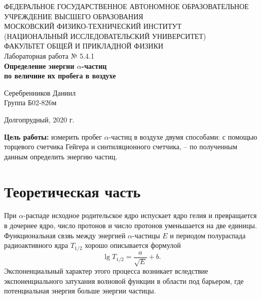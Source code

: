 \documentclass[a4paper,12pt]{article} %
\begin{document}
\begin{center}
	\footnotesize{ФЕДЕРАЛЬНОЕ ГОСУДАРСТВЕННОЕ АВТОНОМНОЕ ОБРАЗОВАТЕЛЬНОЕ 			УЧРЕЖДЕНИЕ ВЫСШЕГО ОБРАЗОВАНИЯ}\\
	\footnotesize{МОСКОВСКИЙ ФИЗИКО-ТЕХНИЧЕСКИЙ ИНСТИТУТ\\(НАЦИОНАЛЬНЫЙ 			ИССЛЕДОВАТЕЛЬСКИЙ УНИВЕРСИТЕТ)}\\
	\footnotesize{ФАКУЛЬТЕТ ОБЩЕЙ И ПРИКЛАДНОЙ ФИЗИКИ\\}
	\hfill \break
	\hfill\break
	\hfill\break
	\hfill \break
	\hfill \break
	\hfill \break
	\hfill \break
	\hfill \break
	\hfill \break
	\hfill \break
	\hfill \break
	\hfill \break
	\hfill \break
	\hfill \break
	\large{Лабораторная работа № 5.4.1 \\\textbf{Определение энергии $\alpha$-частиц\\по величине их пробега в воздухе}}\\
	\hfill \break
	\hfill \break
	\hfill \break
	\begin{flushright}
		Серебренников Даниил\\
		Группа Б02-826м
	\end{flushright}
	\hfill \break
	\hfill \break
	\hfill \break
	\hfill \break
	\hfill \break
	\hfill \break
	\hfill \break
	\hfill \break
	\hfill \break
	\hfill \break
	\hfill \break
\end{center}
\begin{center}
	Долгопрудный, 2020 г.
\end{center}
\thispagestyle{empty}
\newpage
	\textbf{Цель работы:} измерить пробег $\alpha$-частиц в воздухе двумя способами: с помощью торцевого счетчика Гейгера и синтиляционного счетчика, -- по полученным данным определить энергию частиц.

\section{Теоретическая часть}
	При $\alpha$-распаде исходное родительское ядро испускает ядро гелия и превращается в дочернее ядро, число протонов и число протонов уменьшается на две единицы. Функциональная свзяь между энергией $\alpha$-частицы $E$ и периодом полураспада радиоактивного ядра $T_{1/2}$ хорошо описывается формулой
	\begin{equation*}
		 \lg T_{1/2} = \frac{a}{\sqrt{E}} + b.
	\end{equation*}
	Экспоненциальный характер этого процесса возникает вследствие экспоненциального затухания волновой функции в области под барьером, где потенциальная энергия больше энергии частицы.
	
\end{document}
